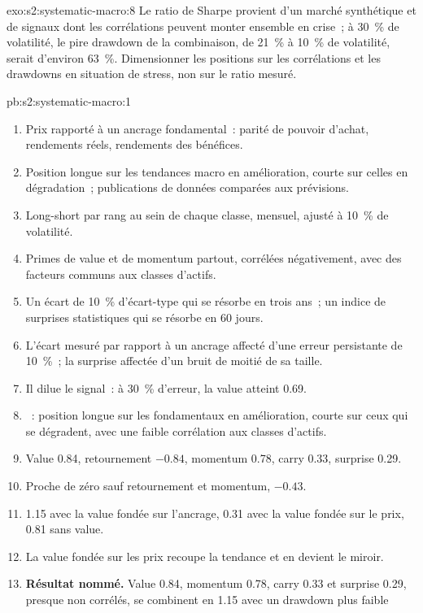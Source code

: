 \begin{solution}{exo:s2:systematic-macro:8}
Le ratio de Sharpe provient d'un marché synthétique et de signaux dont les corrélations peuvent monter ensemble en crise~; à 30~\% de volatilité, le pire
drawdown de la combinaison, de 21~\% à 10~\% de volatilité, serait d'environ 63~\%. Dimensionner les positions sur les corrélations et les drawdowns en situation de stress, non sur le ratio mesuré.
\end{solution}

\begin{solution}{pb:s2:systematic-macro:1}
\begin{enumerate}
\item Prix rapporté à un ancrage fondamental~: parité de pouvoir d'achat, rendements réels, rendements des bénéfices.
\item Position longue sur les tendances macro en amélioration, courte sur celles en dégradation~; publications de données comparées aux prévisions.
\item Long-short par rang au sein de chaque classe, mensuel, ajusté à 10~\% de volatilité.
\item Primes de value et de momentum partout, corrélées négativement, avec des facteurs communs aux classes d'actifs.
\item Un écart de 10~\% d'écart-type qui se résorbe en trois ans~; un indice de surprises statistiques qui se résorbe en 60 jours.
\item L'écart mesuré par rapport à un ancrage affecté d'une erreur persistante de 10~\%~; la surprise affectée d'un bruit de moitié de sa taille.
\item Il dilue le signal~: à 30~\% d'erreur, la value atteint 0.69.
\item {}~: position longue sur les fondamentaux en amélioration, courte sur ceux qui se dégradent, avec une faible corrélation aux classes d'actifs.
\item Value 0.84, retournement $-0.84$, momentum 0.78, carry 0.33, surprise 0.29.
\item Proche de zéro sauf retournement et momentum, $-0.43$.
\item 1.15 avec la value fondée sur l'ancrage, 0.31 avec la value fondée sur le prix, 0.81 sans value.
\item La value fondée sur les prix recoupe la tendance et en devient le miroir.
\item \textbf{Résultat nommé.} Value 0.84, momentum 0.78, carry 0.33 et surprise 0.29, presque non corrélés, se combinent en 1.15 avec un drawdown plus faible

\end{enumerate}
\end{solution}
